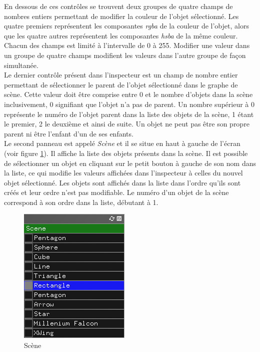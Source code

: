En dessous de ces contrôles se trouvent deux groupes de quatre champs de nombres entiers permettant de modifier la couleur de l'objet sélectionné.
Les quatre premiers représentent les composantes \emph{rgba} de la couleur de l'objet, alors que les quatre autres représentent les composantes \emph{hsba} de la même couleur. Chacun des champs est limité à l'intervalle de 0 à 255. Modifier une valeur dans un groupe de quatre champs modifient les valeurs dans l'autre groupe de façon simultanée.\\

Le dernier contrôle présent dans l'inspecteur est un champ de nombre entier permettant de sélectionner le parent de l'objet sélectionné dans le graphe de scène.
Cette valeur doit être comprise entre 0 et le nombre d'objets dans la scène inclusivement, 0 signifiant que l'objet n'a pas de parent.
Un nombre supérieur à 0 représente le numéro de l'objet parent dans la liste des objets de la scène, 1 étant le premier, 2 le deuxième et ainsi de suite.
Un objet ne peut pas être son propre parent ni être l'enfant d'un de ses enfants.\\

Le second panneau est appelé \emph{Scène} et il se situe en haut à gauche de l'écran (voir figure \ref{fig:scene}).
Il affiche la liste des objets présents dans la scène.
Il est possible de sélectionner un objet en cliquant sur le petit bouton à gauche de son nom dans la liste, ce qui modifie les valeurs affichées dans l'inspecteur à celles du nouvel objet sélectionné.
Les objets sont affichés dans la liste dans l'ordre qu'ils sont créés et leur ordre n'est pas modifiable.
Le numéro d'un objet de la scène correspond à son ordre dans la liste, débutant à 1.\\

\begin{figure}
    \centering
	\includegraphics[scale=1]{fig/scene.png}
	\caption{Scène}
	\label{fig:scene}
\end{figure}

